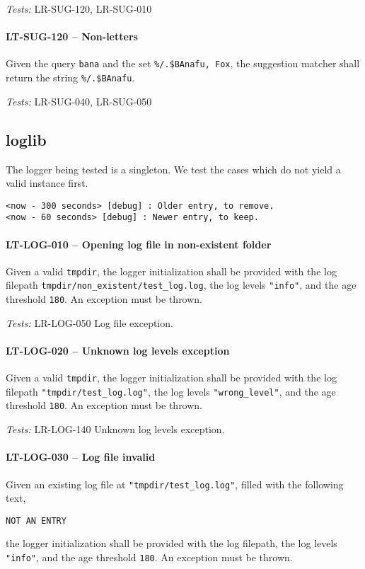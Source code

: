 \textit{Tests: } LR-SUG-120, LR-SUG-010

\paragraph{LT-SUG-120 -- Non-letters}
Given the query \lstinline{bana} and the set
\lstinline{%/.$BAnafu, Fox}, the suggestion matcher shall return
the string \lstinline{%/.$BAnafu}.

\textit{Tests: } LR-SUG-040, LR-SUG-050

\subsection{log\textunderscore lib}
The logger being tested is a singleton. We test the cases which do not
yield a valid instance first.

\begin{minipage}{\linewidth}
  \begin{lstlisting}[caption={Existing log file with old and new entries},
    label={lst:existing_log}]
<now - 300 seconds> [debug] : Older entry, to remove.
<now - 60 seconds> [debug] : Newer entry, to keep.
\end{lstlisting} \end{minipage}

\paragraph{LT-LOG-010 -- Opening log file in non-existent folder}
Given a valid \lstinline{tmpdir}, the logger initialization
shall be provided with the log filepath
\lstinline{tmpdir/non_existent/test_log.log},
the log levels \lstinline{"info"}, and the age threshold \lstinline{180}.
An exception must be thrown.

\textit{Tests: } LR-LOG-050 Log file exception.

\paragraph{LT-LOG-020 -- Unknown log levels exception}
Given a valid \lstinline{tmpdir}, the logger initialization
shall be provided with the log filepath \lstinline{"tmpdir/test_log.log"},
the log levels \lstinline{"wrong_level"}, and the age threshold
\lstinline{180}.
An exception must be thrown.

\textit{Tests: } LR-LOG-140 Unknown log levels exception.

\paragraph{LT-LOG-030 -- Log file invalid}
Given an existing log file at \lstinline{"tmpdir/test_log.log"},
filled with the following text,
\begin{lstlisting}
NOT AN ENTRY
\end{lstlisting}
the logger initialization shall be provided with the log filepath,
the log levels \lstinline{"info"}, and the age threshold \lstinline{180}.
An exception must be thrown.

